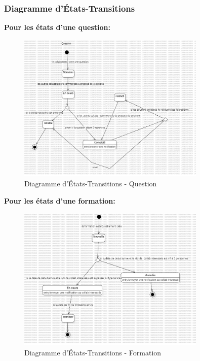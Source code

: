 \documentclass{article}
\begin{document}
            \subsubsection{Diagramme d'États-Transitions}
                \textbf{Pour les états d'une question:}
                \begin{figure}[h!]
                    \centering
                    \includegraphics[width=0.8\textwidth]{assets/diagrammes/jpg/StateMachine1!Question_0.jpg}
                    \caption{Diagramme d'États-Transitions - Question}
                \end{figure}
                \FloatBarrier
                \textbf{Pour les états d'une formation:}
                \begin{figure}[h!]
                    \centering
                    \includegraphics[width=0.8\textwidth]{assets/diagrammes/jpg/StateMachine2!Formation_1.jpg}
                    \caption{Diagramme d'États-Transitions - Formation}
                \end{figure}
                \FloatBarrier
            
\end{document}
